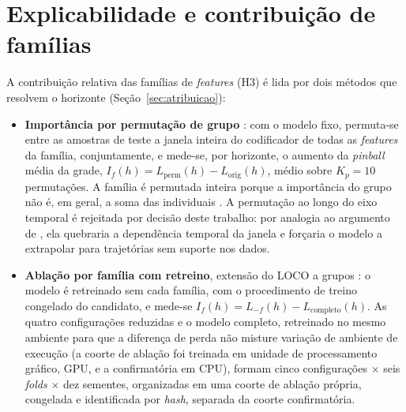 \section{Explicabilidade e contribuição de famílias}\label{sec:metodo-h3}
A contribuição relativa das famílias de \textit{features} (H3) é lida por dois métodos que resolvem o horizonte (Seção~\ref{sec:atribuicao}):
\begin{itemize}
    \item \textbf{Importância por permutação de grupo} \cite{BREIMAN2001,FISHER2019,GREGORUTTI2015}: com o modelo fixo, permuta-se entre as amostras de teste a janela inteira do codificador de todas as \textit{features} da família, conjuntamente, e mede-se, por horizonte, o aumento da \textit{pinball} média da grade, \(I_f(h) = L_{\text{perm}}(h) - L_{\text{orig}}(h)\), médio sobre \(K_p = 10\) permutações. A família é permutada inteira porque a importância do grupo não é, em geral, a soma das individuais \cite{GREGORUTTI2015}. A permutação ao longo do eixo temporal é rejeitada por decisão deste trabalho: por analogia ao argumento de , ela quebraria a dependência temporal da janela e forçaria o modelo a extrapolar para trajetórias sem suporte nos dados.
    \item \textbf{Ablação por família com retreino}, extensão do LOCO a grupos \cite{LEI2018,HOOKER2021}: o modelo é retreinado sem cada família, com o procedimento de treino congelado do candidato, e mede-se \(I_f(h) = L_{-f}(h) - L_{\text{completo}}(h)\). As quatro configurações reduzidas e o modelo completo, retreinado no mesmo ambiente para que a diferença de perda não misture variação de ambiente de execução (a coorte de ablação foi treinada em unidade de processamento gráfico, GPU, e a confirmatória em CPU), formam cinco configurações \(\times\) seis \textit{folds} \(\times\) dez sementes, organizadas em uma coorte de ablação própria, congelada e identificada por \textit{hash}, separada da coorte confirmatória.
\end{itemize}

